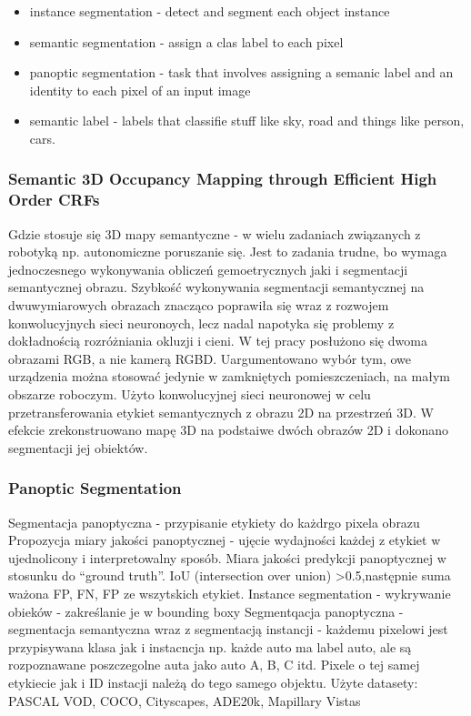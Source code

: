 \documentclass[
]{article}
\providecommand{\tightlist}{%
  \setlength{\itemsep}{0pt}\setlength{\parskip}{0pt}}
\begin{document}
\begin{itemize}
\tightlist
\item
  instance segmentation - detect and segment each object instance
\item
  semantic segmentation - assign a clas label to each pixel
\item
  panoptic segmentation - task that involves assigning a semanic label and an identity to each pixel of an input image
\item
  semantic label - labels that classifie stuff like sky, road and things like person, cars.
\end{itemize}

\subsubsection{Semantic 3D Occupancy Mapping through Efficient High Order CRFs}\label{semantic-3d-occupancy-mapping-through-efficient-high-order-crfs}

Gdzie stosuje się 3D mapy semantyczne - w wielu zadaniach związanych z robotyką np. autonomiczne poruszanie się. Jest to zadania trudne, bo wymaga jednoczesnego wykonywania obliczeń gemoetrycznych jaki i segmentacji semantycznej obrazu. Szybkość wykonywania segmentacji semantycznej na dwuwymiarowych obrazach znacząco poprawiła się wraz z rozwojem konwolucyjnych sieci neuronoych, lecz nadal napotyka się problemy z dokładnością rozróżniania okluzji i cieni.
W tej pracy posłużono się dwoma obrazami RGB, a nie kamerą RGBD. Uargumentowano wybór tym, owe urządzenia można stosować jedynie w zamkniętych pomieszczeniach, na małym obszarze roboczym. Użyto konwolucyjnej sieci neuronowej w celu przetransferowania etykiet semantycznych z obrazu 2D na przestrzeń 3D. W efekcie zrekonstruowano mapę 3D na podstaiwe dwóch obrazów 2D i dokonano segmentacji jej obiektów.

\subsubsection{Panoptic Segmentation}\label{panoptic-segmentation}

Segmentacja panoptyczna - przypisanie etykiety do każdrgo pixela obrazu
Propozycja miary jakości panoptycznej - ujęcie wydajności każdej z etykiet w ujednolicony i interpretowalny sposób. Miara jakości predykcji panoptycznej w stosunku do ``ground truth''. IoU (intersection over union) \textgreater0.5,następnie suma ważona FP, FN, FP ze wszytskich etykiet.
Instance segmentation - wykrywanie obieków - zakreślanie je w bounding boxy
Segmentqacja panoptyczna - segmentacja semantyczna wraz z segmentacją instancji - każdemu pixelowi jest przypisywana klasa jak i instacncja np. każde auto ma label auto, ale są rozpoznawane poszczegolne auta jako auto A, B, C itd. Pixele o tej samej etykiecie jak i ID instacji należą do tego samego objektu.
Użyte datasety: PASCAL VOD, COCO, Cityscapes, ADE20k, Mapillary Vistas
\end{document}
